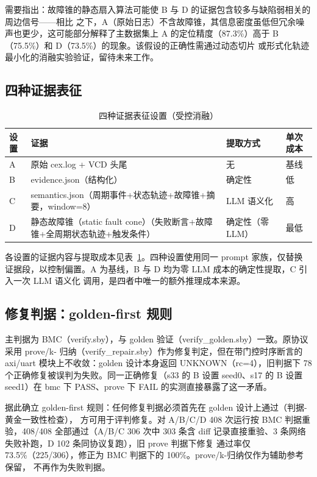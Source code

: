 \documentclass[twocolumn,10pt]{ctexart}
\begin{document}
需要指出：故障锥的静态扇入算法可能使 B 与 D 的证据包含较多与缺陷弱相关的周边信号——相比
之下，A（原始日志）不含故障锥，其信息密度虽低但冗余噪声也更少，这可能部分解释了主数据集上
A 的定位精度（87.3\%）高于 B（75.5\%）和 D（73.5\%）的现象。该假设的正确性需通过动态切片
或形式化轨迹最小化的消融实验验证，留待未来工作。

\subsection{四种证据表征}

\begin{table}[!t]
\centering
\caption{四种证据表征设置（受控消融）}
\label{tab:evidence}
\scriptsize
\setlength{\tabcolsep}{3pt}
\renewcommand{\arraystretch}{1.15}
\begin{tabular}{p{}p{}p{}p{}}
\toprule
\textbf{设置} & \textbf{证据} & \textbf{提取方式} & \textbf{单次成本} \\
\midrule
A & 原始 cex.log + VCD 头尾 & 无 & 基线 \\
B & evidence.json（结构化） & 确定性 & 低 \\
C & semantics.json（周期事件+状态轨迹+故障锥+摘要，window=8） & LLM 语义化 & 高 \\
D & 静态故障锥（static fault cone）（失败断言+故障锥+全周期状态轨迹+触发条件） & 确定性（零 LLM） & 最低 \\
\bottomrule
\end{tabular}
\end{table}

各设置的证据内容与提取成本见表~\ref{tab:evidence}。四种设置使用同一 prompt 家族，仅替换
证据段，以控制偏置。A 为基线，B 与 D 均为零 LLM 成本的确定性提取，C 引入一次 LLM 语义化
调用，是四者中唯一的额外推理成本来源。

\subsection{修复判据：golden-first 规则}

主判据为 BMC（verify.sby），与 golden 验证（verify\_golden.sby）一致。原协议采用 prove/k-
归纳（verify\_repair.sby）作为修复判定，但在带门控时序断言的 axi/uart 模块上不收敛：golden
设计本身返回 UNKNOWN（rc=4），旧判据下 78 个正确修复被误判为失败。同一正确修复（s33 的 B
设置 seed0、s17 的 B 设置 seed1）在 bmc 下 PASS、prove 下 FAIL 的实测直接暴露了这一矛盾。

据此确立 golden-first 规则：任何修复判据必须首先在 golden 设计上通过（判据-黄金一致性检查），
方可用于评判修复。对 A/B/C/D 408 次运行按 BMC 判据重验，408/408 全部通过（A/B/C 306 次中
303 条含 diff 记录直接重验、3 条网络失败补跑，D 102 条同协议复跑），旧 prove 判据下修复
通过率仅 73.5\%（225/306），修正为 BMC 判据下的 100\%。prove/k-归纳仅作为辅助参考保留，
不再作为失败判据。
\end{document}
